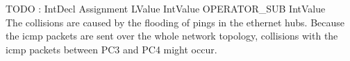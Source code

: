 TODO : IntDecl Assignment LValue IntValue OPERATOR_SUB IntValue \\

The collisions are caused by the flooding of pings in the ethernet hubs. Because the icmp packets are sent over the whole network topology, collisions with the icmp packets between PC3 and PC4 might occur.
